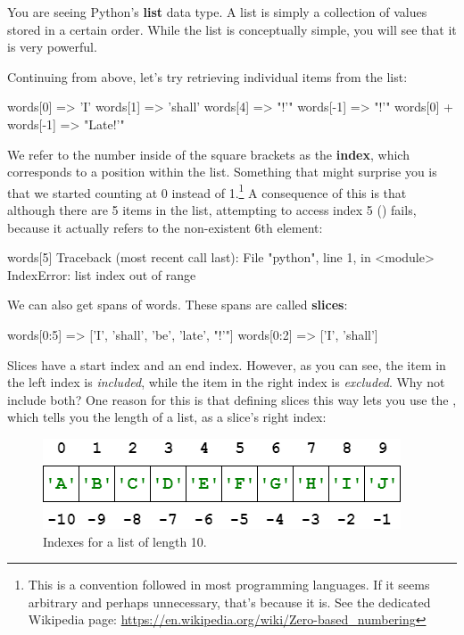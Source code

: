\documentclass{article}
\newcommand\pyi\pythoninline
\begin{document}
\noindent You are seeing Python's \textbf{list} data type. A list is simply a collection of values stored in a certain order. While the list is conceptually simple, you will see that it is very powerful.

Continuing from above, let's try retrieving individual items from the list: 

\begin{python}
words[0]
=> 'I'
words[1]
=> 'shall'
words[4]
=> "!'"
words[-1]
=> "!'"
words[0] + words[-1]
=> "Late!'"
\end{python}

\noindent We refer to the number inside of the square brackets as the \textbf{index}, which corresponds to a position within the list. Something that might surprise you is that we started counting at 0 instead of 1.\footnote{This is a convention followed in most programming languages. If it seems arbitrary and perhaps unnecessary, that's because it is. See the dedicated Wikipedia page: \url{https://en.wikipedia.org/wiki/Zero-based_numbering}} A consequence of this is that although there are 5 items in the list, attempting to access index 5 (\pyi{words[5]}) fails, because it actually refers to the non-existent 6th element:

\begin{python}
words[5]
Traceback (most recent call last):
  File "python", line 1, in <module>
IndexError: list index out of range
\end{python}

We can also get spans of words. These spans are called \textbf{slices}:

\begin{python}
words[0:5]
=> ['I', 'shall', 'be', 'late', "!'"]
words[0:2]
=> ['I', 'shall']
\end{python}

\noindent Slices have a start index and an end index. However, as you can see, the item in the left index is \emph{included}, while the item in the right index is \emph{excluded}. Why not include both? One reason for this is that defining slices this way lets you use the \pyi{len}, which tells you the length of a list, as a slice's right index:

\begin{figure}
    \centering
    \includegraphics[scale=0.6]{list_indexes.png}
    \caption{Indexes for a list of length 10.}
\end{figure}
\end{document}
